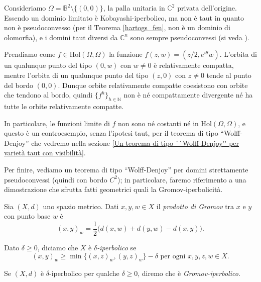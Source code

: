 \begin{ex} \label{servetaut}
    Consideriamo $\Omega=\mathbb{B}^2\setminus\{(0,0)\}$, la palla unitaria in $\mathbb{C}^2$ privata dell'origine. Essendo un dominio limitato è Kobayashi-iperbolico, ma non è taut in quanto non è pseudoconvesso (per il Teorema \ref{hartogs_fen}, non è un dominio di olomorfia), e i domini taut diversi da $\mathbb{C}^n$ sono sempre pseudoconvessi (si veda \cite[Theorem F]{W}).

    Prendiamo come $f\in\text{Hol}(\Omega,\Omega)$ la funzione $f(z,w)=(z/2,e^{i\theta}w)$. L'orbita di un qualunque punto del tipo $(0,w)$ con $w\not=0$ è relativamente compatta, mentre l'orbita di un qualunque punto del tipo $(z,0)$ con $z\not=0$ tende al punto del bordo $(0,0)$. Dunque orbite relativamente compatte coesistono con orbite che tendono al bordo, quindi $\{f^h\}_{h\in\mathbb{N}}$ non è né compattamente divergente né ha tutte le orbite relativamente compatte.
    
    In particolare, le funzioni limite di $f$ non sono né costanti né in $\text{Hol}(\Omega,\Omega)$, e questo è un controesempio, senza l'ipotesi taut, per il teorema di tipo ``Wolff-Denjoy'' che vedremo nella sezione \ref{Un teorema di tipo ``Wolff-Denjoy'' per varietà taut con visibilità}.
\end{ex}

Per finire, vediamo un teorema di tipo ``Wolff-Denjoy'' per domini strettamente pseudoconvessi (quindi con bordo $C^2$); in particolare, faremo riferimento a una dimostrazione che sfrutta fatti geometrici quali la Gromov-iperbolicità.

\begin{defn}
    Sia $(X,d)$ uno spazio metrico. Dati $x,y,w \in X$ il \textit{prodotto di Gromov} tra $x$ e $y$ con punto base $w$ è
    $$(x,y)_w=\frac{1}{2}\big(d(x,w)+d(y,w)-d(x,y)\big).$$
    
    Dato $\delta \ge 0$, diciamo che $X$ è \textit{$\delta$-iperbolico} se
    $$(x,y)_w \ge \min\{(x,z)_w,(y,z)_w\}-\delta\text{ per ogni }x,y,z,w \in X.$$

    Se $(X,d)$ è $\delta$-iperbolico per qualche $\delta \ge 0$, diremo che è \textit{Gromov-iperbolico}.
\end{defn}

